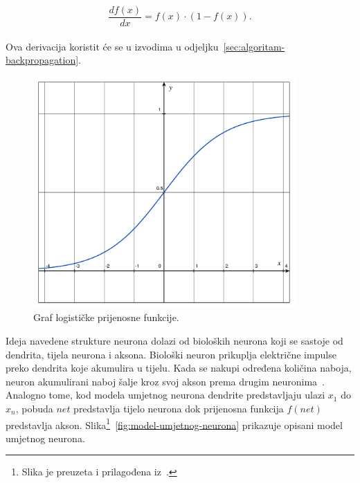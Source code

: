 \begin{equation}
    \frac{df(x)}{dx} = f(x) \cdot (1 - f(x)). \label{eq:logistic-derivation}
\end{equation}\\
Ova derivacija koristit će se u izvodima u odjeljku\ \ref{sec:algoritam-backpropagation}.
\begin{figure}[htb]
    \centering
    \includegraphics[width=10cm]{images/logistic-function.pdf}
    \caption{Graf logističke prijenosne funkcije.}
    \label{fig:logistic-function}
\end{figure}
Ideja navedene strukture neurona dolazi od bioloških neurona koji se sastoje od dendrita, tijela neurona i
aksona. Biološki neuron prikuplja električne impulse preko dendrita koje akumulira u tijelu. Kada se nakupi određena
količina naboja, neuron akumulirani naboj šalje kroz svoj akson prema drugim neuronima\ \citep{cupic2013}. Analogno
tome, kod modela umjetnog neurona dendrite predstavljaju ulazi $x_1$ do $x_n$, pobuda $net$ predstavlja tijelo neurona
dok prijenosna funkcija $f(net)$ predstavlja akson. Slika\footnote{Slika je preuzeta i prilagođena
iz\ \citep{cupic2013}.}\ \ref{fig:model-umjetnog-neurona} prikazuje opisani model umjetnog neurona.

